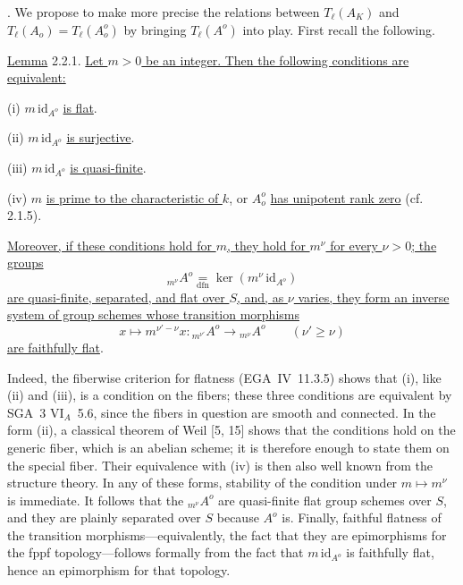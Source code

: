 
\medskip
{}. We propose to make more precise the relations between
$T_\ell(A_K)$ and $T_\ell(A_o)=T_\ell(A_o^o)$ by bringing
$T_\ell(A^o)$ into play.  First recall the following.

\medskip
\noindent
\underline{Lemma} 2.2.1. \underline{Let $m>0$ be an integer.  Then the
following conditions are equivalent:}

\smallskip
\noindent
(i) $m\,\mathrm{id}_{A^o}$ \underline{is flat}.

\noindent
(ii) $m\,\mathrm{id}_{A^o}$ \underline{is surjective}.

\noindent
(iii) $m\,\mathrm{id}_{A^o}$ \underline{is quasi-finite}.

\noindent
(iv) $m$ \underline{is prime to the characteristic of $k$}, or $A_o^o$
\underline{has unipotent rank zero} (cf. 2.1.5).

\smallskip
\noindent
\underline{Moreover, if these conditions hold for $m$, they hold for
$m^\nu$ for every $\nu>0$; the groups}
\[
 {}_{m^\nu}A^o\underset{\mathrm{dfn}}{=}
 \ker(m^\nu\,\mathrm{id}_{A^o})
\]
\underline{are quasi-finite, separated, and flat over $S$, and, as
$\nu$ varies, they form an inverse system of group schemes whose
transition morphisms}
\[
 x\longmapsto m^{\nu'-\nu}x:
 {}_{m^{\nu'}}A^o\longrightarrow{}_{m^\nu}A^o
 \qquad(\nu'\geq\nu)
\]
\underline{are faithfully flat}.

Indeed, the fiberwise criterion for flatness (EGA~IV~11.3.5) shows that
(i), like (ii) and (iii), is a condition on the fibers; these three
conditions are equivalent by SGA~3 $\mathrm{VI}_A$~5.6, since the
fibers in question are smooth and connected.  In the form (ii), a
classical theorem of Weil [5, 15] shows that the conditions hold on the
generic fiber, which is an abelian scheme; it is therefore enough to
state them on the special fiber.  Their equivalence with (iv) is then
also well known from the structure theory.  In any of these forms,
stability of the condition under $m\mapsto m^\nu$ is immediate.  It
follows that the ${}_{m^\nu}A^o$ are quasi-finite flat group schemes
over $S$, and they are plainly separated over $S$ because $A^o$ is.
Finally, faithful flatness of the transition morphisms---equivalently,
the fact that they are epimorphisms for the fppf topology---follows
formally from the fact that $m\,\mathrm{id}_{A^o}$ is faithfully flat,
hence an epimorphism for that topology.

